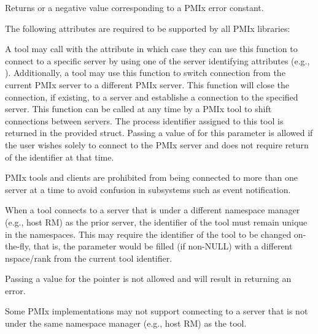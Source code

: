 Returns  or a negative value corresponding to a PMIx error constant.

\reqattrstart
The following attributes are required to be supported by all \ac{PMIx} libraries:


\reqattrend

\descr

A tool may call  with the  attribute in which case they can use this function to connect to a specific server by using one of the server identifying attributes (e.g., ).
Additionally, a tool may use this function to switch connection from the current \ac{PMIx} server to a different \ac{PMIx} server.
This function will close the connection, if existing, to a server and establishe a connection to the specified server.
This function can be called at any time by a \ac{PMIx} tool to shift connections between servers.
The process identifier assigned to this tool is returned in the provided  struct.
Passing a value of  for this parameter is allowed if the user wishes solely to connect to the \ac{PMIx} server and does not require return of the identifier at that time.

\adviceimplstart
\ac{PMIx} tools and clients are prohibited from being connected to more than one server at a time to avoid confusion in subsystems such as event notification.

When a tool connects to a server that is under a different namespace manager (e.g., host \ac{RM}) as the prior server, the identifier of the tool must remain unique in the namespaces. This may require the identifier of the tool to be changed on-the-fly, that is, the  parameter would be filled (if non-NULL) with a different nspace/rank from the current tool identifier.
\adviceimplend

\adviceuserstart
Passing a  value for the  pointer is not allowed and will result in returning an error.

Some \ac{PMIx} implementations may not support connecting to a server that is not under the same namespace manager (e.g., host \ac{RM}) as the tool.
\adviceuserend


